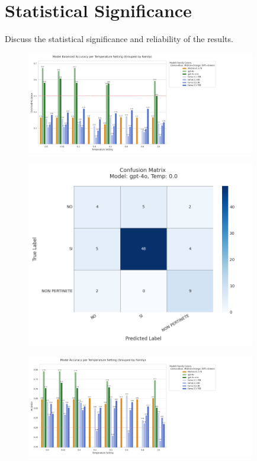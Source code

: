 \documentclass[../main.tex]{subfiles}
\begin{document}
\section{Statistical Significance}
Discuss the statistical significance and reliability of the results.
\begin{figure}[H]
    \includegraphics[width=10cm]{Graphs/Balanced Accuracy.png}
\end{figure}
\begin{figure}[H]
    \includegraphics[width=10cm]{Graphs/Confusion Matrix GPT 4o.png}
\end{figure}
\begin{figure}[H]
    \includegraphics[width=10cm]{Graphs/Model Accuracy final.png}
\end{figure}

\ifSubfilesClassLoaded{
    
    
}{}
\end{document}

